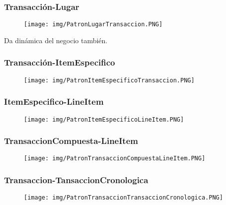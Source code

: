 \subsubsection*{Transacción-Lugar}

\begin{figure}[!htb]
    \centering
    \texttt{[image: img/PatronLugarTransaccion.PNG]}
\end{figure}
Da dinámica del negocio también.
\newpage
\subsubsection*{Transacción-ItemEspecifico}

\begin{figure}[!htb]
    \centering
    \texttt{[image: img/PatronItemEspecificoTransaccion.PNG]}
\end{figure}

\subsubsection*{ItemEspecifico-LineItem}
\begin{figure}[!htb]
    \centering
    \texttt{[image: img/PatronItemEspecificoLineItem.PNG]}
\end{figure}

\subsubsection*{TransaccionCompuesta-LineItem}
\begin{figure}[!htb]
    \centering
    \texttt{[image: img/PatronTransaccionCompuestaLineItem.PNG]}
\end{figure}

\newpage
\subsubsection*{Transaccion-TansaccionCronologica}

\begin{figure}[!htb]
    \centering
    \texttt{[image: img/PatronTransaccionTransaccionCronologica.PNG]}
\end{figure}

